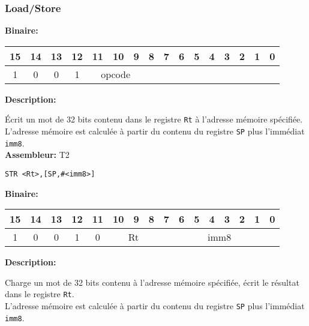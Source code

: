 \subsubsection{Load/Store}

\textbf{Binaire:}\\

\begin{tabular}{| c c c c c c c c c c c c c c c c |}
\hline
15 & 14 & 13 & 12 & \multicolumn{1}{|c}{11} & 10 & 9 & \multicolumn{1}{|c}{8} & 7 & 6 & 5 & 4 & 3 & 2 & 1 & 0 \\
\hline
1 & 0 & 0 & 1 & \multicolumn{3}{|c}{opcode} & \multicolumn{9}{|c|}{} \\
\hline
\end{tabular}


\textbf{Description: }

Écrit un mot de 32 bits contenu dans le registre \texttt{Rt} à l'adresse mémoire spécifiée.\\
L'adresse mémoire est calculée à partir du contenu du registre \texttt{SP} plus l'immédiat \texttt{imm8}.\\

\textbf{Assembleur:} T2

\begin{lstlisting}
STR <Rt>,[SP,#<imm8>]
\end{lstlisting}

\textbf{Binaire:}\\

\begin{tabular}{| c c c c c c c c c c c c c c c c |}
\hline
15 & 14 & 13 & 12 & \multicolumn{1}{|c}{11} & \multicolumn{1}{|c}{10} & 9 & 8 & \multicolumn{1}{|c}{7} & 6 & 5 & 4 & 3 & 2 & 1 & 0 \\
\hline
1 & 0 & 0 & 1 & \multicolumn{1}{|c}{0} & \multicolumn{3}{|c}{Rt} & \multicolumn{8}{|c|}{imm8} \\
\hline
\end{tabular}



\textbf{Description: }

Charge un mot de 32 bits contenu à l'adresse mémoire spécifiée, écrit le résultat dans le registre \texttt{Rt}.\\
L'adresse mémoire est calculée à partir du contenu du registre \texttt{SP} plus l'immédiat \texttt{imm8}.\\

